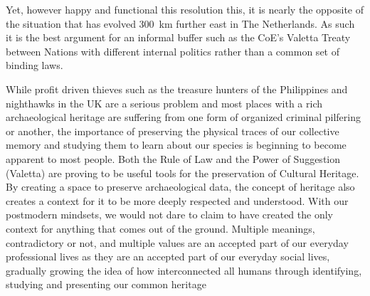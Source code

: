 \documentclass[spanish]{ijsra}
\begin{document}
Yet, however happy and functional this resolution this, it is nearly the opposite of the situation that has evolved \SI{300}{\kilo\metre} further east in The Netherlands. 
As such it is the best argument for an informal buffer such as the CoE’s Valetta Treaty between Nations with different internal politics rather than a common set of binding laws. 

While profit driven thieves such as the treasure hunters of the Philippines and nighthawks in the UK are a serious problem and most places with a rich archaeological heritage are suffering from one form of organized criminal pilfering or another, the importance of preserving the physical traces of our collective memory and studying them to learn about our species is beginning to become apparent to most people. Both the Rule of Law \parencite{RA10066} and the Power of Suggestion (Valetta) are proving to be useful tools for the preservation of Cultural Heritage. By creating a space to preserve archaeological data, the concept of heritage also creates a context for it to be more deeply respected and understood. With our postmodern mindsets, we would not dare to claim to have created the only context for anything that comes out of the ground. Multiple meanings, contradictory or not, and multiple values are an accepted part of our everyday professional lives as they are an accepted part of our everyday social lives, gradually growing the idea of how interconnected all humans through identifying, studying and presenting our common heritage






\IJSRAclosing
\end{document}
